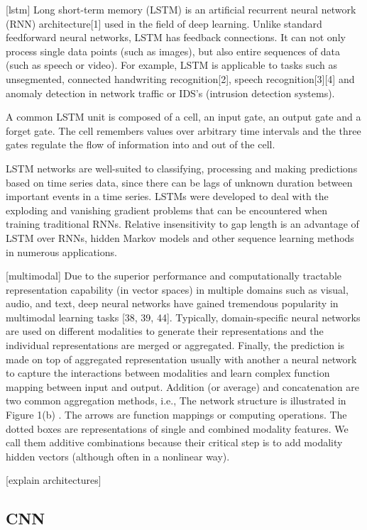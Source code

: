 \documentclass{turabian-thesis}
\begin{document}
[lstm]
Long short-term memory (LSTM) is an artificial recurrent neural network (RNN) architecture[1] used in the field of deep learning. Unlike standard feedforward neural networks, LSTM has feedback connections. It can not only process single data points (such as images), but also entire sequences of data (such as speech or video). For example, LSTM is applicable to tasks such as unsegmented, connected handwriting recognition[2], speech recognition[3][4] and anomaly detection in network traffic or IDS's (intrusion detection systems).

A common LSTM unit is composed of a cell, an input gate, an output gate and a forget gate. The cell remembers values over arbitrary time intervals and the three gates regulate the flow of information into and out of the cell.


LSTM networks are well-suited to classifying, processing and making predictions based on time series data, since there can be lags of unknown duration between important events in a time series. LSTMs were developed to deal with the exploding and vanishing gradient problems that can be encountered when training traditional RNNs. Relative insensitivity to gap length is an advantage of LSTM over RNNs, hidden Markov models and other sequence learning methods in numerous applications.



[multimodal]
Due to the superior performance and computationally tractable representation capability (in vector spaces) in multiple domains such as visual, audio, and text, deep neural networks have gained tremendous popularity in multimodal learning tasks [38, 39, 44]. Typically, domain-specific neural networks are used on different modalities to generate their representations and the individual representations are merged or aggregated. Finally, the prediction is made on top of aggregated representation usually with another a neural network to capture the interactions between modalities and learn complex function mapping between input and output. Addition (or average) and concatenation are two common aggregation methods, i.e.,
The network structure is illustrated in Figure 1(b) . The arrows are function mappings or computing operations. The dotted boxes are representations of single and combined modality features. We call them additive combinations because their critical step is to add modality hidden vectors (although often in a nonlinear way).


[explain architectures]

\subsection{CNN}
\end{document}
